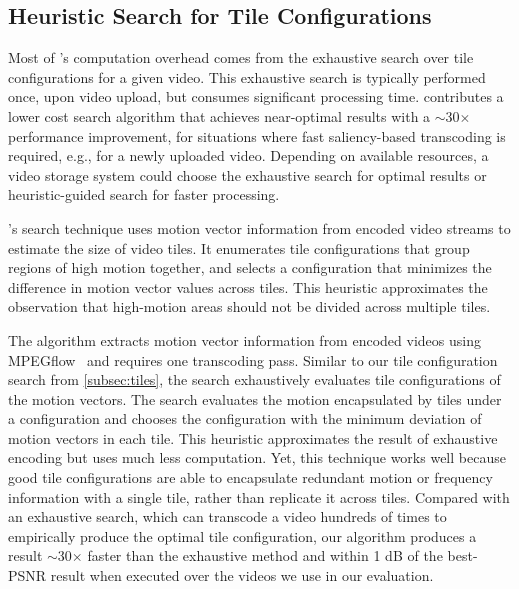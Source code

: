 \subsection{Heuristic Search for Tile Configurations}
\label{subsec:search-algo}

Most of \name's computation overhead comes from the exhaustive search over tile configurations for a given video.
This exhaustive search is typically performed once, upon video upload, but consumes significant processing time.
\nameStore contributes a lower cost search algorithm that achieves near-optimal results with a $\sim$30$\times$ performance improvement, for situations where fast saliency-based transcoding is required, e.g., for a newly uploaded video.
Depending on available resources, a video storage system could choose the exhaustive search for optimal results or heuristic-guided search for faster processing.

\name's search technique uses motion vector information from encoded video streams to estimate the size of video tiles.
It enumerates tile configurations that group regions of high motion together, and selects a configuration that minimizes the difference in motion vector values across tiles.
This heuristic approximates the observation that high-motion areas should not be divided across multiple tiles.

The algorithm extracts motion vector information from encoded videos using {{MPEGflow}}~\cite{mpegflow} and requires one transcoding pass.
Similar to our tile configuration search from \ref{subsec:tiles}, the search exhaustively evaluates tile configurations of the motion vectors.
The search evaluates the motion encapsulated by tiles under a configuration and chooses the configuration with the minimum deviation of motion vectors in each tile.
This heuristic approximates the result of exhaustive encoding but uses much less computation.
Yet, this technique works well because good tile configurations are able to encapsulate redundant motion or frequency information with a single tile, rather than replicate it across tiles.
Compared with an exhaustive search, which can transcode a video hundreds of times to empirically produce the optimal tile configuration, our algorithm produces a result $\sim$30$\times$ faster than the exhaustive method and within 1 dB of the best-PSNR result when executed over the videos we use in our evaluation.

